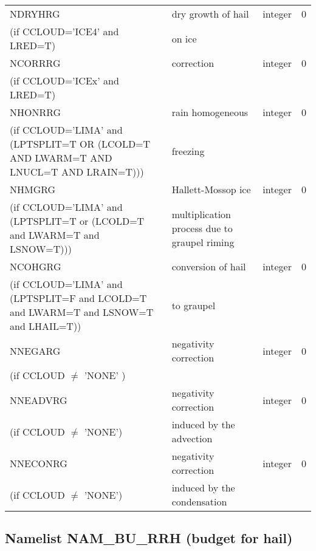 \begin{longtable} {|p{}|p{}|>{\centering}p{}|p{}<{\centering}|}
NDRYHRG&    dry growth of hail& integer  &  0 \index{NDRYHRG!\innam{NAM\_BU\_RRG}}\\ \nopagebreak
(if CCLOUD='ICE4' and LRED=T) &  on ice&   &  \\\hline
NCORRRG&   correction & integer  &  0 \index{NCORRRG!\innam{NAM\_BU\_RRG}}\\ \nopagebreak
(if CCLOUD='ICEx' and LRED=T) &  &   &  \\\hline
NHONRRG  & rain homogeneous  & integer  &  0 \index{NHONRRG!\innam{NAM\_BU\_RRG}}\\ \nopagebreak
(if CCLOUD='LIMA' and (LPTSPLIT=T OR (LCOLD=T AND LWARM=T AND LNUCL=T AND LRAIN=T)))   & freezing  &       &   \\\hline
NHMGRG  & Hallett-Mossop ice  & integer  &  0 \index{NHMGRG!\innam{NAM\_BU\_RRG}}\\ \nopagebreak
(if CCLOUD='LIMA' and (LPTSPLIT=T or (LCOLD=T and LWARM=T and LSNOW=T))) & multiplication process due to graupel riming  &   &  \\\hline
NCOHGRG  & conversion of hail  & integer  &  0 \index{NCOHGRG!\innam{NAM\_BU\_RRG}}\\ \nopagebreak
(if CCLOUD='LIMA' and (LPTSPLIT=F and LCOLD=T and LWARM=T and LSNOW=T and LHAIL=T)) &to graupel  &   &  \\\hline
NNEGARG   & negativity correction & integer  &  0 \index{NNEGARG!\innam{NAM\_BU\_RRG}}\\ \nopagebreak
(if CCLOUD $\neq$ 'NONE' )& &   &  \\\hline
NNEADVRG  & negativity correction  & integer  &  0 \index{NNEADVRG!\innam{NAM\_BU\_RRG}}\\ \nopagebreak
(if CCLOUD $\neq$ 'NONE') & induced by the advection&   &  \\\hline
NNECONRG  &negativity correction    & integer  &  0 \index{NNECONRG!\innam{NAM\_BU\_RRG}}\\ \nopagebreak
(if CCLOUD $\neq$ 'NONE') &induced by the condensation &   &  \\\hline
\end{longtable}

\subsection{Namelist NAM\_BU\_RRH (budget for hail)}

